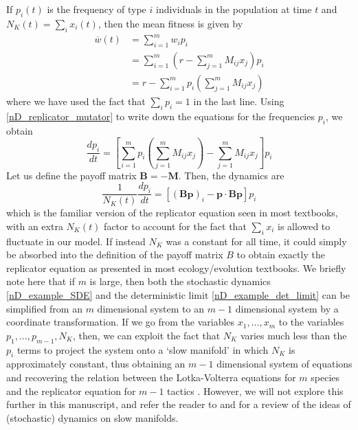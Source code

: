 If $p_i(t)$ is the frequency of type $i$ individuals in the population at time $t$ and $N_K(t) = \sum_i x_i(t)$, then the mean fitness is given by
\begin{align}
\overline{w}(t) &= \sum\limits_{i=1}^{m}w_ip_i\\
&= \sum\limits_{i=1}^{m}\left(r - \sum\limits_{j=1}^{m}M_{ij}x_j\right)p_i\\
&= r - \sum\limits_{i=1}^{m}p_i\left(\sum\limits_{j=1}^{m}M_{ij}x_j\right)
\end{align}
where we have used the fact that $\sum_i p_i = 1$ in the last line. Using \eqref{nD_replicator_mutator} to write down the equations for the frequencies $p_i$, we obtain
\begin{equation}
\frac{dp_i}{dt} = \left[\sum\limits_{i=1}^{m}p_i\left(\sum\limits_{j=1}^{m}M_{ij}x_j\right) - \sum\limits_{j=1}^{m}M_{ij}x_j\right]p_i
\end{equation}
Let us define the payoff matrix $\mathbf{B} = - \mathbf{M}$. Then, the dynamics are
\begin{equation}
\frac{1}{N_K(t)}\frac{dp_i}{dt} = \left[(\mathbf{Bp})_i - \mathbf{p}\cdot\mathbf{Bp}\right]p_i   
\end{equation}
which is the familiar version of the replicator equation seen in most textbooks, with an extra $N_K(t)$ factor to account for the fact that $\sum_i x_i$ is allowed to fluctuate in our model. If instead $N_K$ was a constant for all time, it could simply be absorbed into the definition of the payoff matrix $B$ to obtain exactly the replicator equation as presented in most ecology/evolution textbooks. We briefly note here that if $m$ is large, then both the stochastic dynamics \eqref{nD_example_SDE} and the deterministic limit \eqref{nD_example_det_limit} can be simplified from an $m$ dimensional system to an $m-1$ dimensional system by a coordinate transformation. If we go from the variables $x_1,\ldots,x_m$ to the variables $p_1,\ldots,p_{m-1},N_K$, then, we can exploit the fact that $N_K$ varies much less than the $p_i$ terms to project the system onto a `slow manifold' in which $N_K$ is approximately constant, thus obtaining an $m-1$ dimensional system of equations and recovering the relation between the Lotka-Volterra equations for $m$ species and the replicator equation for $m-1$ tactics \citep{constable_mapping_2017,parsons_dimension_2017}. However, we will not explore this further in this manuscript, and refer the reader to \citep{constable_stochastic_2013} and \citep{parsons_dimension_2017} for a review of the ideas of (stochastic) dynamics on slow manifolds.\\
